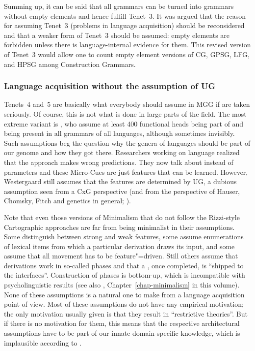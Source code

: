 \documentclass[output=paper
	        ,collection
	        ,collectionchapter
 	        ,biblatex
                ,babelshorthands
                ,newtxmath
                ,draftmode
                ,colorlinks, citecolor=brown
]{langscibook}
\begin{document}
Summing up, it can be said that all grammars can be turned into grammars without empty elements and
hence fulfill Tenet~3. It was argued that the reason for assuming Tenet~3 (problems in language
acquisition) should be reconsidered and that a weaker form of Tenet~3 should be assumed: empty
elements are forbidden unless there is language-internal evidence for them. This revised version of
Tenet~3 would allow one to count empty element versions of CG, GPSG, LFG, and HPSG among Construction Grammars.



\subsubsection{Language acquisition without the assumption of UG}

Tenets~4 and~5 are basically what everybody should assume in MGG if \citet*{HCF2002a} are taken seriously. Of
course, this is not what is done in large parts of the field. The most extreme variant is
\citet{CR2010a}, who assume at least 400 functional heads being part of  and being present in all grammars of all languages, although sometimes
invisibly. Such assumptions beg the question why the genera of  languages should be part of our
genome and how they got there. 
Researchers working on language  realized that the 
approach \citep{Meisel95a} makes wrong predictions. They now talk about  instead of
parameters \citep{Westergaard2014a} and these Micro-Cues are just features that can be
learned. However, Westergaard still assumes that the features are determined by UG, a dubious
assumption seen from a CxG perspective (and from the perspective of Hauser, Chomsky, Fitch and
genetics in general; \citealt{Bishop2002a}).

Note that even those versions of Minimalism that do not follow the Rizzi-style Cartographic
approaches are far from being minimalist in their assumptions. Some distinguish between strong
and weak features, some assume enumerations of lexical items from which a particular derivation
draws its input, and some assume that all movement has to be feature"=driven. Still others assume that
derivations work in so-called phases and that a , once completed, is ``shipped to the
interfaces''. Construction of phases is bottom-up, which is incompatible with psycholinguistic
results (see also \citealt[Section~\ref{sec-minimalism-processing}]{chapters/minimalism}, Chapter~\ref{chap-minimalism} in this
volume). None of these assumptions is a natural one to make from a
language acquisition point of view. Most of these assumptions do not have any empirical motivation; the
only motivation usually given is that they result in ``restrictive theories''. But if there is no
motivation for them, this means that the respective architectural assumptions have to be part of our
innate domain-specific knowledge, which is implausible according to \citet*{HCF2002a}.
\end{document}
